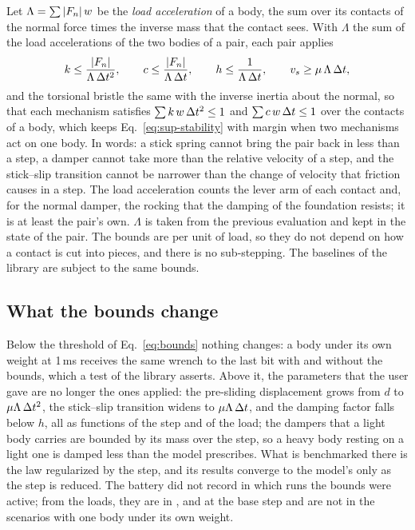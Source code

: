 Let $\Lambda = \sum|F_n|\,w$ be the \emph{load acceleration} of a body, the sum over its
contacts of the normal force times the inverse mass that the contact sees. With $\Lambda$ the
sum of the load accelerations of the two bodies of a pair, each pair applies
\begin{equation}
  k \le \frac{|F_n|}{\Lambda\,\Delta t^2}, \qquad c \le \frac{|F_n|}{\Lambda\,\Delta t}, \qquad
  h \le \frac{1}{\Lambda\,\Delta t}, \qquad v_s \ge \mu\,\Lambda\,\Delta t ,
  \label{eq:bounds}
\end{equation}
and the torsional bristle the same with the inverse inertia about the normal, so that each
mechanism satisfies $\sum k\,w\,\Delta t^2\le1$ and $\sum c\,w\,\Delta t\le1$ over the contacts of a body,
which keeps Eq.~\eqref{eq:sup-stability} with margin when two mechanisms act on one body. In
words: a stick spring cannot bring the pair back in less than a step, a damper cannot take more
than the relative velocity of a step, and the stick--slip transition cannot be narrower than
the change of velocity that friction causes in a step. The load acceleration counts the lever
arm of each contact and, for the normal damper, the rocking that the damping of the foundation
resists; it is at least the pair's own. $\Lambda$ is taken from the previous evaluation and
kept in the state of the pair. The bounds are per unit of load, so they do not depend on how a
contact is cut into pieces, and there is no sub-stepping. The baselines of the library are
subject to the same bounds.

\subsection{What the bounds change}

Below the threshold of Eq.~\eqref{eq:bounds} nothing changes: a body under its own weight at
1\,ms receives the same wrench to the last bit with and without the bounds, which a test of the
library asserts. Above it, the parameters that the user gave are no longer the ones applied: the
pre-sliding displacement grows from $d$ to $\mu\Lambda\,\Delta t^2$, the stick--slip transition widens
to $\mu\Lambda\,\Delta t$, and the damping factor falls below $h$, all as functions of the step and of
the load; the dampers that a light body carries are bounded by its mass over the step, so a
heavy body resting on a light one is damped less than the model prescribes. What is benchmarked
there is the law regularized by the step, and its results converge to the model's only as the
step is reduced. The battery did not record in which runs the bounds were active; from the
loads, they are in ,  and  at the base step and are not in
the scenarios with one body under its own weight.
